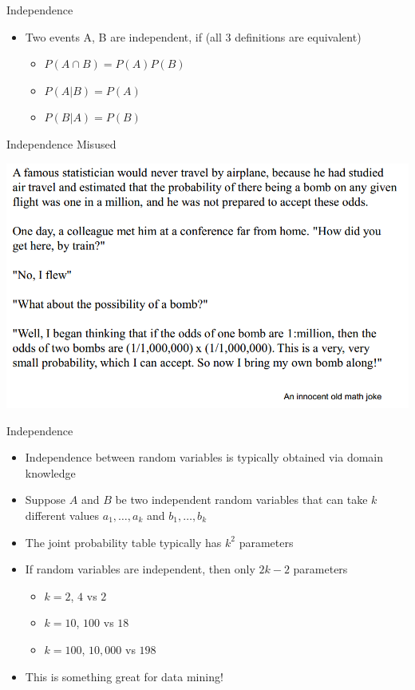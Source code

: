 \documentclass{beamer}
\begin{document}
\begin{frame}{Independence}
    \begin{itemize}
        \item Two events A, B are independent, if (all 3 definitions are equivalent)
        \begin{itemize}
            \item $P(A \cap B) = P(A) P(B)$
            \item $P(A|B) = P(A)$
            \item $P(B|A) = P(B)$
        \end{itemize}
    \end{itemize}
\end{frame}

\begin{frame}{Independence Misused}
    \begin{center}
        \includegraphics[scale=0.36]{independenceJoke.png}
    \end{center}
\end{frame}

\begin{frame}{Independence}
    \begin{itemize}
        \item Independence between random variables is typically obtained via domain knowledge
        \item Suppose $A$ and $B$ be two independent random variables that can take $k$ different values $a_1, \ldots, a_k$ and $b_1, \ldots, b_k$
        \item The joint probability table typically has $k^2$ parameters
        \item If random variables are independent, then only $2k-2$ parameters
        \begin{itemize}
            \item $k=2$, $4$ vs $2$
            \item $k=10$, $100$ vs $18$
            \item $k=100$, $10,000$ vs $198$
        \end{itemize}
        \item This is something great for data mining!
    \end{itemize}
\end{frame}
\end{document}
